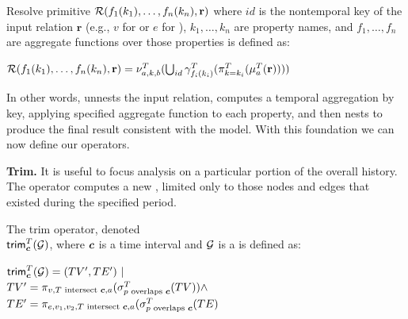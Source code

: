 \begin{definition}
\label{def:resolve}
Resolve primitive $\mathcal{R}(f_1(k_1), \ldots, f_n(k_n),\mathbf{r})$
where $id$ is the nontemporal key of the input relation $\mathbf{r}$
(e.g., $v$ for \tv or $e$ for \te), $k_1, \ldots, k_n$ are property
names, and $f_1, \ldots, f_n$ are aggregate functions over those
properties is defined as:

$\mathcal{R}(f_1(k_1), \ldots, f_n(k_n),\mathbf{r}) = \nu^T_{a,k,b}(\bigcup
  _{id}\gamma^T_{f_i(k_i)}(\pi^T_{k=k_i}(\mu^T_a(\mathbf{r}))))$
\end{definition}

In other words,  unnests the input relation, computes a
temporal aggregation by key, applying specified aggregate function to
each property, and then nests to produce the final result consistent
with the \tg model.  With this foundation we can now define our \tga
operators.

{\bf Trim.}  It is useful to focus analysis on a particular portion of
the overall \tg history.  The  operator computes a new
\tg, limited only to those nodes and edges that existed during the
specified period.

\begin{definition}[Trim]
\label{def:slice}
The trim operator, denoted \\$\textsf{trim}^T_{\boldsymbol{c}}(\mathcal{G})$, where
$\boldsymbol{c}$ is a time interval and $\mathcal{G}$ is a \tg is defined as:

$\textsf{trim}^T_{\boldsymbol{c}}(\mathcal{G}) = (TV', TE') ~|~$\\ $TV' = \pi_{v,T \text{ intersect } \boldsymbol{c},a}(\sigma^T_{p \text{ overlaps } \boldsymbol{c}}(TV)) \land$ \\ $TE' = \pi_{e,v_1,v_2,T \text{ intersect } \boldsymbol{c},a}(\sigma^T_{p \text{ overlaps } \boldsymbol{c}}(TE)$
\end{definition}

